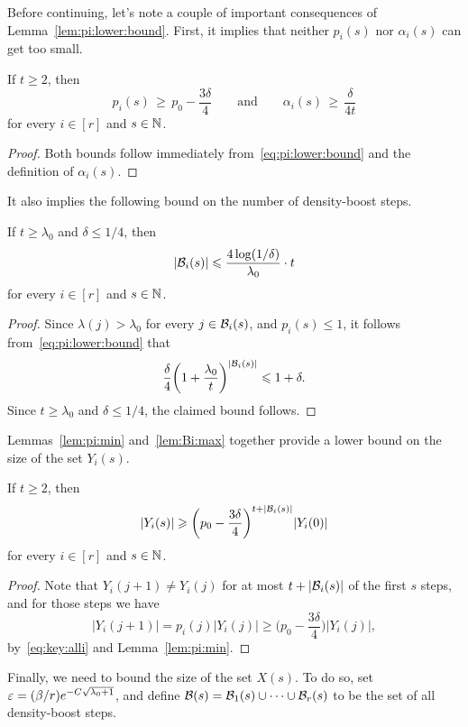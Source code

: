 Before continuing, let's note a couple of important consequences of Lemma~\ref{lem:pi:lower:bound}. First, it implies that neither $p_i(s)$ nor $\alpha_i(s)$ can get too small. 

\begin{lemma}\label{lem:pi:min}
If\/ $t \ge 2$, then 
$$p_i(s) \, \ge \, p_0 - \frac{3\delta}{4} \qquad \text{and} \qquad \alpha_i(s) \, \ge \, \frac{\delta}{4t}$$
for every $i \in [r]$ and $s \in \mathbb{N}$. 
\end{lemma}

\begin{proof}
Both bounds follow immediately from~\eqref{eq:pi:lower:bound} and the definition of $\alpha_i(s)$. 
\end{proof}

It also implies the following bound on the number of density-boost steps. 

\begin{lemma}\label{lem:Bi:max}
If\/ $t \ge \lambda_0$ and\/ $\delta \le 1/4$, then
$$|\mathcal{B}_i(s)| \leqslant \frac{4 \log(1/\delta)}{\lambda_0} \cdot t$$
for every $i \in [r]$ and $s \in \mathbb{N}$. 
\end{lemma}

\begin{proof}
Since $\lambda(j) > \lambda_0$ for every $j \in \mathcal{B}_i(s)$, and $p_i(s) \le 1$, it follows from~\eqref{eq:pi:lower:bound} that
$$\frac{\delta}{4} \bigg( 1 + \frac{\lambda_0}{t} \bigg)^{|\mathcal{B}_i(s)|} \leqslant 1 + \delta.$$
Since $t \ge \lambda_0$ and $\delta \le 1/4$, the claimed bound follows. 
\end{proof}

Lemmas~\ref{lem:pi:min} and~\ref{lem:Bi:max} together provide a lower bound on the size of the set $Y_i(s)$. 

\begin{lemma}\label{lem:Y:lower:bound}
If\/ $t \ge 2$, then
$$|Y_i(s)| \geqslant \bigg( p_0 - \frac{3\delta}{4} \bigg)^{t + |\mathcal{B}_i(s)|} |Y_i(0)|$$
for every $i \in [r]$ and $s \in \mathbb{N}$. 
\end{lemma}

\begin{proof}
Note that $Y_i(j+1) \ne Y_i(j)$ for at most $t + |\mathcal{B}_i(s)|$ of the first $s$ steps, and for those steps we have
$$|Y_i(j+1)| = p_i(j) |Y_i(j)| \ge \bigg( p_0 - \frac{3\delta}{4} \bigg) |Y_i(j)|,$$ 
by~\eqref{eq:key:alli} and Lemma~\ref{lem:pi:min}.
\end{proof}

Finally, we need to bound the size of the set $X(s)$. To do so, set $\varepsilon = (\beta / r) e^{- C \sqrt{\lambda_0 + 1}}$, and define $\mathcal{B}(s) = \mathcal{B}_1(s) \cup \cdots \cup \mathcal{B}_r(s)$ to be the set of all density-boost steps. 


